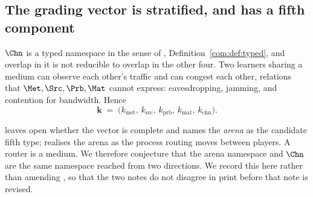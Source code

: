 \begin{table}[t]
\centering\small
{}
\caption{The hierarchy as a shutoff sequence. Each row is a level boundary,
identified by which component of the grading vector has gone to zero and
whether merger is still available. The ordering is
Observation~\ref{eng:obs:order}; the availability of $\Merge$ is
Proposition~\ref{eng:prop:indiv}.}
\label{eng:tab:levels}
\end{table}

\subsection{The grading vector is stratified, and has a fifth component}\label{eng:S9.3}

\begin{proposition}\label{eng:prop:fifth}
$\Chn$ is a typed namespace in the sense of
\chComp, Definition~\ref{com:def:typed}, and overlap in it is not reducible to overlap in
the other four. Two learners sharing a medium can observe each other's
traffic and can congest each other, relations that
$\Met, \Src, \Prb, \Mat$ cannot express: eavesdropping, jamming, and
contention for bandwidth. Hence
\[
  \mathbf{k} \;=\; \bigl(k_{\mathrm{met}},\, k_{\mathrm{src}},\,
  k_{\mathrm{prb}},\, k_{\mathrm{mat}},\, k_{\mathrm{chn}}\bigr).
\]
\end{proposition}

\begin{remark}\label{eng:this-very-likely-arena}
\chComp leaves open whether the vector is complete and names the
\emph{arena} as the candidate fifth type; \chGame realises the arena
as the process routing moves between players. A router is a medium. We
therefore conjecture that the arena namespace and $\Chn$ are the same
namespace reached from two directions. We record this here rather than
amending \chComp, so that the two notes do not disagree in print
before that note is revised.
\end{remark}

